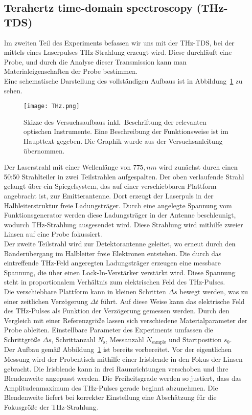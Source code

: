\subsection{\label{sec:aufbau2}Terahertz time-domain spectroscopy (THz-TDS)}
Im zweiten Teil des Experiments befassen wir uns mit der THz-TDS, bei der mittels eines Laserpulses 
THz-Strahlung erzeugt wird. Diese durchläuft eine Probe, und durch die Analyse dieser Transmission kann man Materialeigenschaften der Probe bestimmen. \\
Eine schematische Darstellung des vollständigen Aufbaus ist in Abbildung~\ref{fig:thztds} zu sehen.
\begin{figure}[h!]
    \centering
    \texttt{[image: THz.png]}
    \caption{\label{fig:thztds}Skizze des Versuchsaufbaus inkl.~Beschriftung der relevanten optischen 
    Instrumente. Eine Beschreibung der Funktionsweise ist im Haupttext gegeben. Die Graphik wurde aus 
    der Versuchsanleitung \cite{Anleitung} übernommen.}
\end{figure}\FloatBarrier
Der Laserstrahl mit einer Wellenlänge von $775,\si{nm}$ wird zunächst durch einen 50:50 Strahlteiler 
in zwei Teilstrahlen aufgespalten. 
Der oben verlaufende Strahl gelangt über ein Spiegelsystem, das auf einer verschiebbaren Plattform angebracht ist, zur Emitterantenne. 
Dort erzeugt der Laserpuls in der Halbleiterstruktur freie Ladungsträger. Durch eine angelegte Spannung vom Funktionsgenerator werden 
diese Ladungsträger in der Antenne beschleunigt, wodurch THz-Strahlung ausgesendet wird. 
Diese Strahlung wird mithilfe zweier Linsen auf eine Probe fokussiert. \\
Der zweite Teilstrahl wird zur Detektorantenne geleitet, wo erneut durch den Bänderübergang im Halbleiter freie Elektronen entstehen. 
Die durch das eintreffende THz-Feld angeregten Ladungsträger erzeugen eine messbare Spannung, die über einen Lock-In-Verstärker 
verstärkt wird. 
Diese Spannung steht in proportionalem Verhältnis zum elektrischen Feld des THz-Pulses. \\
Die verschiebbare Plattform kann in kleinen Schritten $\Delta s$ bewegt werden, was zu einer zeitlichen Verzögerung 
$\Delta t$ führt. 
Auf diese Weise kann das elektrische Feld des THz-Pulses als Funktion der Verzögerung gemessen werden. 
Durch den Vergleich mit einer Referenzgröße lassen sich verschiedene Materialparameter der Probe ableiten. 
Einstellbare Parameter des Experiments umfassen die Schrittgröße $\Delta s$, Schrittanzahl $N_{\text{s}}$, Messanzahl $N_{\text{sample}}$ und Startposition $s_{0}$. \\
Der Aufbau gemäß Abbildung~\ref{fig:thztds} ist bereits vorbereitet. 
Vor der eigentlichen Messung wird der Probentisch mithilfe einer Irisblende in den Fokus der Linsen gebracht. 
Die Irisblende kann in drei Raumrichtungen verschoben und ihre Blendenweite angepasst werden. 
Die Freiheitsgrade werden so justiert, dass das Amplitudenmaximum des THz-Pulses gerade beginnt abzunehmen. 
Die Blendenweite liefert bei korrekter Einstellung eine Abschätzung für die Fokusgröße der THz-Strahlung.